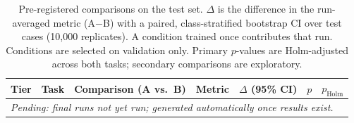 \begin{table}[t]
\centering
\scriptsize
\caption{Pre-registered comparisons on the test set. $\Delta$ is the difference in the run-averaged metric (A$-$B) with a paired, class-stratified bootstrap CI over test cases (10{,}000 replicates). A condition trained once contributes that run. Conditions are selected on validation only. Primary $p$-values are Holm-adjusted across both tasks; secondary comparisons are exploratory.}
\label{tab:comparisons}
\begin{tabular}{llp{5.2cm}lccc}
\toprule
Tier & Task & Comparison (A vs.\ B) & Metric & $\Delta$ (95\% CI) & $p$ & $p_{\text{Holm}}$\\
\midrule
\multicolumn{7}{l}{\textit{Pending: final runs not yet run; generated automatically once results exist.}}\\
\bottomrule
\end{tabular}
\end{table}

